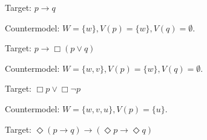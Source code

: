 \begin{solution}
  \medskip
    
  \begin{sollist}
  \item Target: $p\to q$
  

    Countermodel: $W = \{ w \}, V(p) = \{ w \}, V(q) = \emptyset$.
    
    \medskip
  \item Target: $p \to \Box(p \lor q)$


    Countermodel: $W = \{ w, v \}, V(p) = \{ w \}, V(q) = \emptyset$.

  \medskip
  \item Target: $\Box p \lor \Box \neg p$
    

    Countermodel: $W = \{ w,v,u \}, V(p) = \{ u \}$.
    
    \medskip
  \item Target: $\Diamond(p \to q) \to (\Diamond p \to \Diamond q)$


\end{sollist}
\end{solution}
